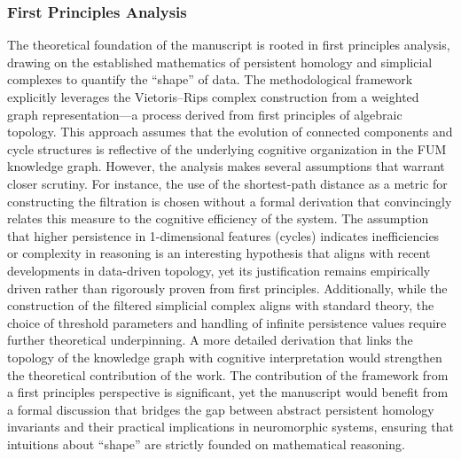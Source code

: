 \documentclass[12pt]{article}
\begin{document}
\subsubsection{First Principles Analysis  }
The theoretical foundation of the manuscript is rooted in first principles analysis, drawing on the established mathematics of persistent homology and simplicial complexes to quantify the “shape” of data. The methodological framework explicitly leverages the Vietoris–Rips complex construction from a weighted graph representation—a process derived from first principles of algebraic topology. This approach assumes that the evolution of connected components and cycle structures is reflective of the underlying cognitive organization in the FUM knowledge graph. However, the analysis makes several assumptions that warrant closer scrutiny. For instance, the use of the shortest-path distance as a metric for constructing the filtration is chosen without a formal derivation that convincingly relates this measure to the cognitive efficiency of the system. The assumption that higher persistence in 1-dimensional features (cycles) indicates inefficiencies or complexity in reasoning is an interesting hypothesis that aligns with recent developments in data-driven topology, yet its justification remains empirically driven rather than rigorously proven from first principles. Additionally, while the construction of the filtered simplicial complex aligns with standard theory, the choice of threshold parameters and handling of infinite persistence values require further theoretical underpinning. A more detailed derivation that links the topology of the knowledge graph with cognitive interpretation would strengthen the theoretical contribution of the work. The contribution of the framework from a first principles perspective is significant, yet the manuscript would benefit from a formal discussion that bridges the gap between abstract persistent homology invariants and their practical implications in neuromorphic systems, ensuring that intuitions about “shape” are strictly founded on mathematical reasoning.
\end{document}
